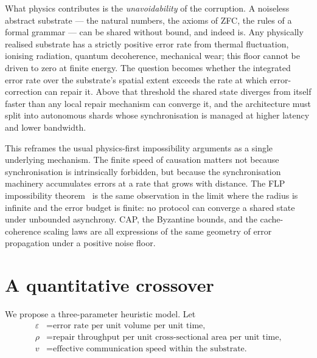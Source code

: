 \documentclass[11pt]{article}
\begin{document}
What physics contributes is the \emph{unavoidability} of the corruption. A noiseless abstract substrate --- the natural numbers, the axioms of ZFC, the rules of a formal grammar --- can be shared without bound, and indeed is. Any physically realised substrate has a strictly positive error rate from thermal fluctuation, ionising radiation, quantum decoherence, mechanical wear; this floor cannot be driven to zero at finite energy. The question becomes whether the integrated error rate over the substrate's spatial extent exceeds the rate at which error-correction can repair it. Above that threshold the shared state diverges from itself faster than any local repair mechanism can converge it, and the architecture must split into autonomous shards whose synchronisation is managed at higher latency and lower bandwidth.

This reframes the usual physics-first impossibility arguments as a single underlying mechanism. The finite speed of causation matters not because synchronisation is intrinsically forbidden, but because the synchronisation machinery accumulates errors at a rate that grows with distance. The FLP impossibility theorem~\cite{flp} is the same observation in the limit where the radius is infinite and the error budget is finite: no protocol can converge a shared state under unbounded asynchrony. CAP, the Byzantine bounds, and the cache-coherence scaling laws are all expressions of the same geometry of error propagation under a positive noise floor.

\section{A quantitative crossover}

We propose a three-parameter heuristic model. Let
\begin{align*}
  \varepsilon &= \text{error rate per unit volume per unit time,}\\
  \rho        &= \text{repair throughput per unit cross-sectional area per unit time,}\\
  v           &= \text{effective communication speed within the substrate.}
\end{align*}
\end{document}
